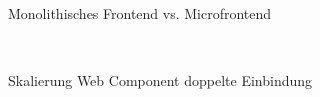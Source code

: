 \begin{figure}[hbt!]
	\centering
	\begin{minipage}[t]{0.65\textwidth}	
		\caption{Monolithisches Frontend vs. Microfrontend}
		\\ %
		\label{fig:MonolithicMicrofrontend}
	\end{minipage}
\end{figure}

\newpage
\begin{figure}[hbt!]
	\centering
	\begin{minipage}[t]{1\textwidth}	
		\caption{Skalierung Web Component doppelte Einbindung}
		\\ %
		\label{fig:EvalWCSkalierbarkeit}
	\end{minipage}
\end{figure}


